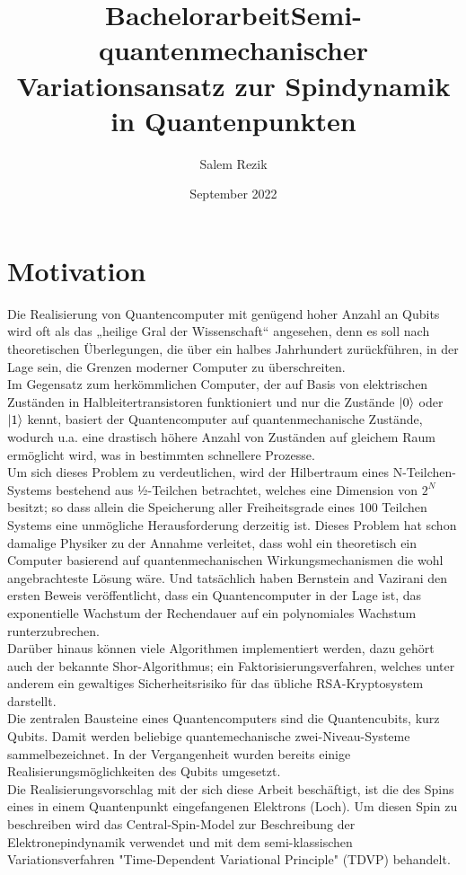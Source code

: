 \documentclass[12pt]{article}
\title{Bachelorarbeit}
\author{Salem Rezik}
\date{September 2022}
\begin{document}
\title{Semi-quantenmechanischer Variationsansatz zur Spindynamik in Quantenpunkten}
\maketitle
\tableofcontents

\newpage
\section{Motivation}
Die Realisierung von Quantencomputer mit genügend hoher Anzahl an Qubits wird oft als das „heilige Gral der Wissenschaft“ angesehen, denn 
es soll nach theoretischen Überlegungen, die über ein halbes Jahrhundert zurückführen, in der Lage sein, die Grenzen moderner Computer zu 
überschreiten. \\Im Gegensatz zum herkömmlichen Computer, der auf Basis von elektrischen Zuständen in Halbleitertransistoren funktioniert 
und nur die Zustände $\ket{0}$ oder $\ket{1}$ kennt, basiert der Quantencomputer auf quantenmechanische Zustände, wodurch u.a. eine 
drastisch höhere Anzahl von Zuständen auf gleichem Raum ermöglicht wird, was in bestimmten schnellere Prozesse.\\
Um sich dieses Problem zu verdeutlichen, wird der Hilbertraum eines N-Teilchen-Systems bestehend aus ½-Teilchen betrachtet, welches eine 
Dimension von $2^N$ besitzt; so dass allein die Speicherung aller Freiheitsgrade eines 100 Teilchen Systems eine unmögliche Herausforderung
 derzeitig ist. Dieses Problem hat schon damalige Physiker zu der Annahme verleitet, dass wohl ein theoretisch ein Computer basierend 
 auf quantenmechanischen Wirkungsmechanismen die wohl angebrachteste Lösung wäre. Und tatsächlich haben Bernstein and Vazirani 
 den ersten Beweis veröffentlicht, dass ein Quantencomputer in der Lage ist, das exponentielle Wachstum der Rechendauer auf ein 
 polynomiales Wachstum runterzubrechen.\\
Darüber hinaus können viele Algorithmen implementiert werden, dazu gehört auch der bekannte Shor-Algorithmus; ein Faktorisierungsverfahren,
welches unter anderem ein gewaltiges Sicherheitsrisiko für das übliche RSA-Kryptosystem darstellt.\\

\noindent Die zentralen Bausteine eines Quantencomputers sind die Quantencubits, kurz Qubits. Damit werden beliebige quantemechanische 
zwei-Niveau-Systeme sammelbezeichnet. In der Vergangenheit wurden bereits einige Realisierungsmöglichkeiten des Qubits umgesetzt.\\
Die Realisierungsvorschlag mit der sich diese Arbeit beschäftigt, ist die des Spins eines in einem Quantenpunkt eingefangenen 
Elektrons (Loch). Um diesen Spin zu beschreiben wird das Central-Spin-Model zur Beschreibung der Elektronepindynamik verwendet und mit 
dem semi-klassischen Variationsverfahren "Time-Dependent Variational Principle" (TDVP) behandelt.\\
\end{document}
